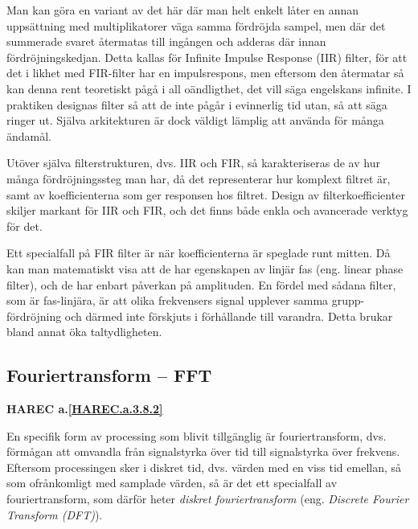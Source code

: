 Man kan göra en variant av det här där man helt enkelt låter en annan
uppsättning med multiplikatorer väga samma fördröjda sampel, men där det
summerade svaret återmatas till ingången och adderas där innan
fördröjningskedjan.
Detta kallas för Infinite Impulse Response (IIR) filter, för att det i likhet
med FIR-filter har en impulsrespons, men eftersom den återmatar så kan denna
rent teoretiskt pågå i all oändligthet, det vill säga engelskans infinite.
I praktiken designas filter så att de inte pågår i evinnerlig tid utan, så att
säga ringer ut.
Själva arkitekturen är dock väldigt lämplig att använda för många ändamål.

Utöver själva filterstrukturen, dvs. IIR och FIR, så karakteriseras de av hur
många fördröjningssteg man har, då det representerar hur komplext filtret är,
samt av koefficienterna som ger responsen hos filtret.
Design av filterkoefficienter skiljer markant för IIR och FIR, och det finns
både enkla och avancerade verktyg för det.

Ett specialfall på FIR filter är när koefficienterna är speglade runt mitten.
Då kan man matematiskt visa att de har egenskapen av linjär fas (eng. linear
phase filter), och de har enbart påverkan på amplituden.
En fördel med sådana filter, som är fas-linjära, är att olika frekvensers
signal upplever samma grupp-fördröjning och därmed inte förskjuts i förhållande
till varandra.
Detta brukar bland annat öka taltydligheten.

\subsection{Fouriertransform -- FFT}
\textbf{HAREC a.\ref{HAREC.a.3.8.2}\label{myHAREC.a.3.8.2}}

En specifik form av processing som blivit tillgänglig är fouriertransform,
dvs. förmågan att omvandla från signalstyrka över tid till signalstyrka över
frekvens.
Eftersom processingen sker i diskret tid, dvs. värden med en viss tid emellan,
så som ofrånkomligt med samplade värden, så är det ett specialfall av
fouriertransform, som därför heter \emph{diskret fouriertransform} (eng.
\emph{Discrete Fourier Transform (DFT)}).

